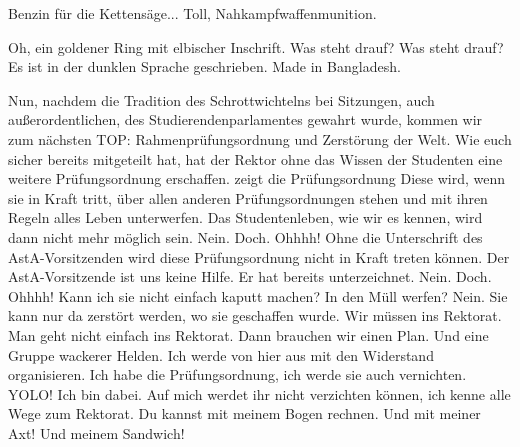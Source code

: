 \begin{verseplay}[7em]
\s{\Legolars}  Benzin für die Kettensäge...  Toll, Nahkampfwaffenmunition. 
\end{verseplay}
\begin{verseplay}[7em]
\s{\Elron} Oh, ein goldener Ring mit elbischer Inschrift.
\s{\Sum} Was steht drauf? Was steht drauf?
\s{\Elron} Es ist in der dunklen Sprache geschrieben.  Made in Bangladesh.
\end{verseplay}
\begin{verseplay}[7em]
\s{\Elron} Nun, nachdem die Tradition des Schrottwichtelns bei Sitzungen, auch außerordentlichen, des Studierendenparlamentes gewahrt wurde, kommen wir zum nächsten TOP: Rahmenprüfungsordnung und Zerstörung der Welt.
\s{\Gandalf} Wie \Frodo euch sicher bereits mitgeteilt hat, hat der Rektor ohne das Wissen der Studenten eine weitere Prüfungsordnung erschaffen.
\s{\Frodo} zeigt die Prüfungsordnung
\s{\Gandalf} Diese wird, wenn sie in Kraft tritt, über allen anderen Prüfungsordnungen stehen und mit ihren Regeln alles Leben unterwerfen. Das Studentenleben, wie wir es kennen, wird dann nicht mehr möglich sein.
\s{\Elron} Nein.
\s{\Gandalf} Doch.
 Ohhhh!
\s{\Elron}  Ohne die Unterschrift des AstA-Vorsitzenden wird diese Prüfungsordnung nicht in Kraft treten können.
\s{\Gandalf} Der AstA-Vorsitzende ist uns keine Hilfe. Er hat bereits unterzeichnet.
\s{\Elron} Nein.
\s{\Gandalf} Doch.
 Ohhhh!
\s{\Frodo} Kann ich sie nicht einfach kaputt machen? In den Müll werfen?
\s{\Gandalf} Nein. Sie kann nur da zerstört werden, wo sie geschaffen wurde. Wir müssen ins Rektorat.
\s{\Elron} Man geht nicht einfach ins Rektorat.
\s{\Gimli} Dann brauchen wir einen Plan. Und eine Gruppe wackerer Helden.
\s{\Elron} Ich werde von hier aus mit \Galadriel den Widerstand organisieren.
\s{\Frodo} Ich habe die Prüfungsordnung, ich werde sie auch vernichten. 
\s{\Sum} YOLO! Ich bin dabei.
\s{\Gandalf} Auf mich werdet ihr nicht verzichten können, ich kenne alle Wege zum Rektorat.
\s{\Legolars} Du kannst mit meinem Bogen rechnen. 
\s{\Gimli} Und mit meiner Axt! Und meinem Sandwich! 
\end{verseplay}

